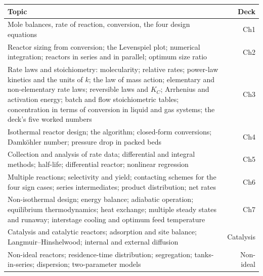 \documentclass[10pt,a4paper]{article}
\newcommand{\spsub}[1]{\par\addvspace{7pt}\noindent{\color{accent}\bfseries #1}\par\addvspace{3pt}\nopagebreak}
\providecommand{\toprule}{\hline}
\providecommand{\midrule}{\hline}
\providecommand{\bottomrule}{\hline}
\begin{document}
\spsub{What is inside}
\begin{tabularx}{\linewidth}{@{}Xr@{}}
\toprule
\textbf{\color{accent}Topic} & \textbf{Deck}\\
\midrule
Mole balances, rate of reaction, conversion, the four design equations & Ch1\\
Reactor sizing from conversion; the Levenspiel plot; numerical integration;
 reactors in series and in parallel; optimum size ratio & Ch2\\
Rate laws and stoichiometry: molecularity; relative rates; power-law
 kinetics and the units of $k$; the law of mass action; elementary and
 non-elementary rate laws; reversible laws and $K_C$; Arrhenius and
 activation energy; batch and flow stoichiometric tables; concentration
 in terms of conversion in liquid and gas systems; the deck's five
 worked numbers & Ch3\\
Isothermal reactor design; the algorithm; closed-form conversions;
 Damk\"ohler number; pressure drop in packed beds & Ch4\\
Collection and analysis of rate data; differential and integral methods;
 half-life; differential reactor; nonlinear regression & Ch5\\
Multiple reactions; selectivity and yield; contacting schemes for the
 four sign cases; series intermediates; product distribution; net rates & Ch6\\
Non-isothermal design; energy balance; adiabatic operation; equilibrium
 thermodynamics; heat exchange; multiple steady states and runaway;
 interstage cooling and optimum feed temperature & Ch7\\
Catalysis and catalytic reactors; adsorption and site balance;
 Langmuir--Hinshelwood; internal and external diffusion & Catalysis\\
Non-ideal reactors; residence-time distribution; segregation;
 tanks-in-series; dispersion; two-parameter models & Non-ideal\\
\bottomrule
\end{tabularx}
\end{document}
